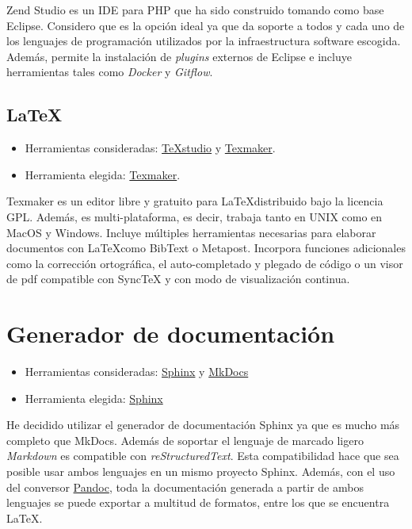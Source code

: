 Zend Studio es un IDE para PHP que ha sido construido tomando como base Eclipse. Considero que es la opción ideal ya que da soporte a todos y cada uno de los lenguajes de programación utilizados por la infraestructura software escogida. Además, permite la instalación de \emph{plugins} externos de Eclipse e incluye herramientas tales como \emph{Docker} y \emph{Gitflow}. 

\subsection{LaTeX}\label{latex}

\begin{itemize}
\tightlist
	\item Herramientas consideradas:
  		\href{https://www.texstudio.org/}{TeXstudio} y
  		\href{http://www.xm1math.net/texmaker/}{Texmaker}.
	\item Herramienta elegida:
  		\href{http://www.xm1math.net/texmaker/}{Texmaker}.
\end{itemize}

Texmaker es un editor libre y gratuito para \LaTeX distribuido bajo la licencia GPL. Además, es multi-plataforma, es decir, trabaja tanto en UNIX como en MacOS y Windows. Incluye múltiples herramientas necesarias para elaborar documentos con \LaTeX como BibText o Metapost. Incorpora funciones adicionales como la corrección ortográfica, el auto-completado y plegado de código o un visor de pdf compatible con SyncTeX y con modo de visualización continua. 

\section{Generador de documentación}\label{gen-doc}

\begin{itemize}
\tightlist
	\item Herramientas consideradas:
  		\href{https://www.sphinx-doc.org/es/master/index.html}{Sphinx} y
  		\href{https://www.mkdocs.org/} {MkDocs}
	\item Herramienta elegida:
  		\href{https://www.sphinx-doc.org/es/master/index.html}{Sphinx}
\end{itemize}

He decidido utilizar el generador de documentación Sphinx ya que es mucho más completo que MkDocs. Además de soportar el lenguaje de marcado ligero \emph{Markdown} es compatible con \emph{reStructuredText}. Esta compatibilidad hace que sea posible usar ambos lenguajes en un mismo proyecto Sphinx. Además, con el uso del conversor \href{http://pandoc.org/}{Pandoc}, toda la documentación generada a partir de ambos lenguajes se puede exportar a multitud de formatos, entre los que se encuentra \LaTeX.

